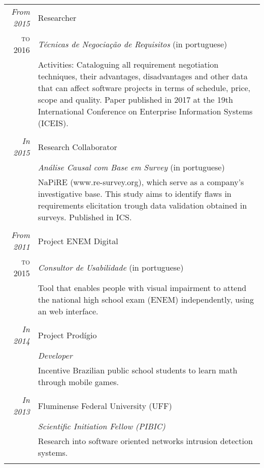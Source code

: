 \documentclass[a4paper,10pt]{article}
\begin{document}
\begin{tabular}{r|p{12.2cm}}
 \emph{From 2015} & Researcher \\
 \textsc{to 2016}&\emph{Técnicas de Negociação de Requisitos} (in portuguese) \\
  
 &\footnotesize{Activities: Cataloguing all requirement negotiation techniques, their advantages, disadvantages and other data that can affect software projects in terms of schedule, price, scope and quality. Paper published in 2017 at the 19th International Conference on Enterprise Information Systems (ICEIS).}\\
 
 & \\
 
 \emph{In 2015} & Research Collaborator \\
 \textsc{}&\emph{Análise Causal com Base em Survey} (in portuguese) \\
 &\footnotesize{NaPiRE (www.re-survey.org), which serve as a company's investigative base. This study aims to identify flaws in requirements elicitation trough data validation obtained in surveys. Published in ICS.}\\
 
 & \\

 \emph{From 2011} & Project ENEM Digital \\
 \textsc{to 2015}&\emph{Consultor de Usabilidade} (in portuguese) \\ 
 &\footnotesize{Tool that enables people with visual impairment to attend the national high school exam (ENEM) independently, using an web interface.}\\
 
 & \\
 
 \emph{In 2014} & Project Prodígio \\
 \textsc{}&\emph{Developer}\\
 &\footnotesize{Incentive Brazilian public school students to learn math through mobile games.}\\
 
 & \\
 
 \emph{In 2013} & Fluminense Federal University (UFF) \\
 \textsc{}&\emph{Scientific Initiation Fellow (PIBIC)}\\
 &\footnotesize{Research into software oriented networks intrusion detection systems.}\\
 
 \multicolumn{2}{c}{} \end{tabular}
\end{document}
